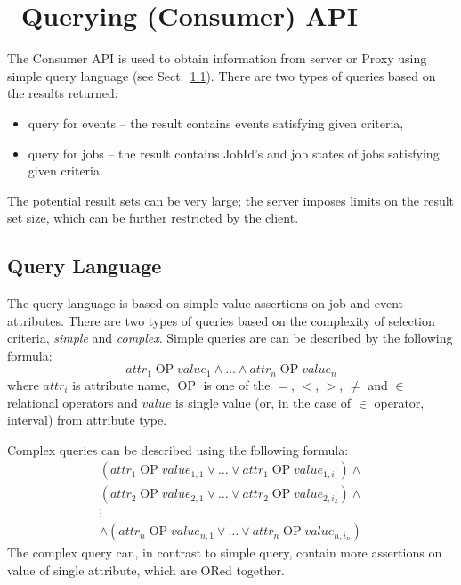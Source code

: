 
\section{\LB\ Querying (Consumer) API}
\label{s:ConsOview}
The \LB Consumer API is used to obtain information from \LB server
or Proxy using simple query language (see
Sect.~\ref{s:querylang}). There are two types of queries based
on the results returned:
\begin{itemize}
\item query for events -- the result contains events satisfying given
criteria,
\item query for jobs -- the result contains JobId's and job states of jobs
satisfying given criteria.
\end{itemize}
The potential result sets can be very large; the \LB server imposes
limits on the result set size, which can be further restricted by the
client. 


\subsection{Query Language}
\label{s:querylang}
The \LB query language is based on simple value assertions on job and
event attributes. There are two types of queries based on the
complexity of selection criteria, \textit{simple} and
\textit{complex}.
Simple queries are can be described by the following formula:
\begin{displaymath}
\textit{attr}_1 \mathop{\textrm{ OP }} \textit{value}_1 \wedge \dots \wedge
\textit{attr}_n \mathop{\textrm{ OP }} \textit{value}_n 
\end{displaymath}
where $\textit{attr}_i$ is attribute name, $\mathop{\textrm{ OP }}$ is
one of the $=$, $<$, $>$, $\neq$ and $\in$ relational operators and
$\textit{value}$ is single value (or, in the case of $\in$ operator,
interval) from attribute type. 

Complex queries can be described using the following formula:
\begin{multline*}
(\textit{attr}_1 \mathop{\textrm{ OP }} \textit{value}_{1,1} \vee \dots \vee
\textit{attr}_1 \mathop{\textrm{ OP }} \textit{value}_{1,i_1}) \wedge \\
(\textit{attr}_2 \mathop{\textrm{ OP }} \textit{value}_{2,1} \vee \dots \vee
\textit{attr}_2 \mathop{\textrm{ OP }} \textit{value}_{2,i_2}) \wedge \\
\vdots \\
\wedge (\textit{attr}_n \mathop{\textrm{ OP }} \textit{value}_{n,1} \vee \dots \vee 
\textit{attr}_n \mathop{\textrm{ OP }} \textit{value}_{n,i_n}) 
\end{multline*}
The complex query can, in contrast to simple query, contain more
assertions on value of single attribute, which are ORed together.

